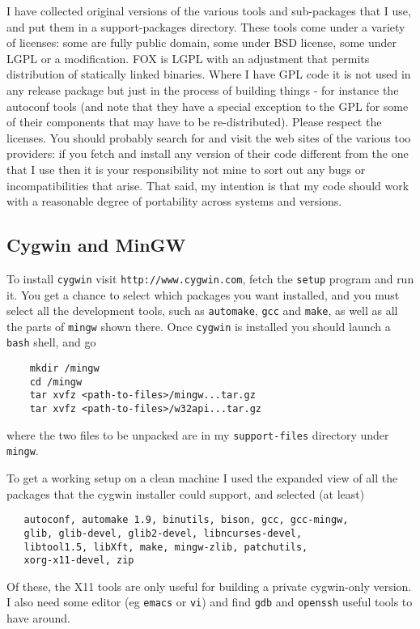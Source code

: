 \documentclass[11pt]{article}
\begin{document}
I have collected original versions of the various tools and
sub-packages that I use, and put them in a support-packages
directory. These tools come under a variety of licenses: some are
fully public domain, some under BSD license, some under LGPL or
a modification. FOX is LGPL with an adjustment that permits distribution
of statically linked binaries. Where I have GPL code it is not used
in any release package but just in the process of building things -
for instance the autoconf tools (and note that they have a special
exception to the GPL for some of their components that may have to
be re-distributed). Please respect the licenses. You should probably
search for and visit the web sites of the various too providers: if you
fetch and install any version of their code different from the one that
I use then it is your responsibility not mine to sort out any bugs or
incompatibilities that arise. That said, my intention is that my code
should work with a reasonable degree of portability across systems and
versions.

\subsection{Cygwin and MinGW}
To install \verb+cygwin+ visit \verb+http://www.cygwin.com+, fetch the
\verb+setup+ program and run it. You get a chance to select which packages
you want installed, and you must select all the development tools, such
as \verb+automake+, \verb+gcc+ and \verb+make+, as well as all the
parts of \verb+mingw+ shown there.  Once \verb+cygwin+ is installed you should
launch a \verb+bash+ shell, and go
\begin{verbatim}
    mkdir /mingw
    cd /mingw
    tar xvfz <path-to-files>/mingw...tar.gz
    tar xvfz <path-to-files>/w32api...tar.gz
\end{verbatim}
\noindent where the two files to be unpacked are in my \verb+support-files+
directory under \verb+mingw+.

To get a working setup on a clean machine I used the expanded view of all the
packages that the cygwin installer could support, and selected (at least)
\begin{verbatim}
   autoconf, automake 1.9, binutils, bison, gcc, gcc-mingw,
   glib, glib-devel, glib2-devel, libncurses-devel,
   libtool1.5, libXft, make, mingw-zlib, patchutils,
   xorg-x11-devel, zip
\end{verbatim}
\noindent Of these, the X11 tools are only useful for building a
private cygwin-only version. I also need some editor (eg \verb.emacs.
or \verb.vi.) and find \verb.gdb. and \verb.openssh. useful tools
to have around.
\end{document}
